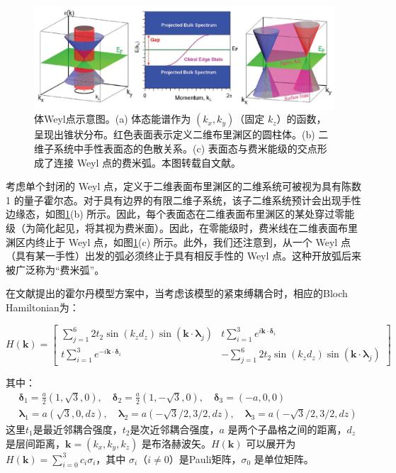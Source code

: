 \begin{figure}[htbp]
    \centering
    \includegraphics[width=1\linewidth]{figure/FracHaldExp/FermiArc.png}
    \caption{体Weyl点示意图。(a) 体态能谱作为 \( (k_x, k_y) \)（固定 \( k_z \)）的函数，呈现出锥状分布。红色表面表示定义二维布里渊区的圆柱体。(b) 二维子系统中手性表面态的色散关系。(c) 表面态与费米能级的交点形成了连接 Weyl 点的费米弧。本图转载自文献\cite{wan2011topological}。}
    \label{fig:enter-label}
    \label{fig:FermiArc}
\end{figure}

考虑单个封闭的 Weyl 点，定义于二维表面布里渊区的二维系统可被视为具有陈数 1 的量子霍尔态。对于具有边界的有限二维子系统，该子二维系统预计会出现手性边缘态，如图\ref{fig:FermiArc}(b) 所示。因此，每个表面态在二维表面布里渊区的某处穿过零能级（为简化起见，将其视为费米面）。因此，在零能级时，费米线在二维表面布里渊区内终止于 Weyl 点，如图\ref{fig:FermiArc}(c) 所示。此外，我们还注意到，从一个 Weyl 点（具有某一手性）出发的弧必须终止于具有相反手性的 Weyl 点。这种开放弧后来被广泛称为“费米弧”。

在文献提出的霍尔丹模型方案中，当考虑该模型的紧束缚耦合时，相应的Bloch Hamiltonian为：

\begin{equation}
H(\mathbf{k}) =
\begin{bmatrix}
\sum_{j=1}^{6} 2 t_2 \sin (k_zd_z) \sin (\mathbf{k} \cdot \bm{\lambda}_j) & 
t \sum_{i=1}^{3} e^{i \mathbf{k} \cdot \bm{\delta}_i} \\
t \sum_{i=1}^{3} e^{-i \mathbf{k} \cdot \bm{\delta}_i} &
-\sum_{j=1}^{6} 2 t_2 \sin (k_zd_z) \sin (\mathbf{k} \cdot \bm{\lambda}_j)
\end{bmatrix}
\end{equation}

其中：
\begin{align}
& \bm{\delta}_1 = \frac{a}{2} (1, \sqrt{3}, 0), \quad
\bm{\delta}_2 = \frac{a}{2} (1, -\sqrt{3}, 0), \quad
\bm{\delta}_3 = (-a,0, 0) \\
& \bm{\lambda}_1 = a(\sqrt{3}, 0, dz), \quad
\bm{\lambda}_2 = a(-\sqrt{3}/2, 3/2, dz), \quad
\bm{\lambda}_3 = a(-\sqrt{3}/2, 3/2, dz)
\end{align}
这里$t_1$是最近邻耦合强度，$t_2$是次近邻耦合强度，$a$ 是两个子晶格之间的距离，$d_z$ 是层间距离，$\mathbf{k} = (k_x, k_y, k_z)$ 是布洛赫波矢。$H(\mathbf{k})$ 可以展开为 $H(\mathbf{k}) = \sum_{i=0}^3 c_i \sigma_i$，其中 $\sigma_i$（$i \neq 0$）是Pauli矩阵，$\sigma_0$ 是单位矩阵。

